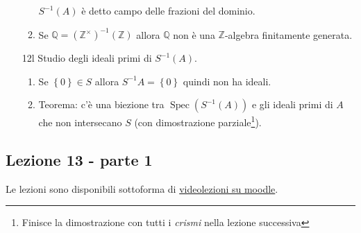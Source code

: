 \documentclass[italian]{article}
\begin{document}
\begin{enumerate}
\begin{enumerate}
            $S^{-1}(A)$ è detto campo delle frazioni del dominio.
          \item Se $\mathbb{Q} = (\mathbb{Z}^\times)^{-1}(\mathbb{Z})$ allora
            $\mathbb{Q}$ non è una $\mathbb{Z}$-algebra finitamente generata. 
        \end{enumerate}
      \item[12l] Studio degli ideali primi di $S^{-1}(A)$.
        \begin{enumerate}
          \item Se $\left\{ 0 \right\} \in S$ allora $S^{-1}A = \left\{ 0
            \right\}$ quindi non ha ideali.
          \item Teorema: c'è una biezione tra $\operatorname{Spec}(S^{-1}(A))$
            e gli ideali primi di $A$ che non intersecano $S$ (con
            dimostrazione parziale\footnote{Finisce la dimostrazione con tutti i 
            \textit{crismi} nella lezione successiva}).
        \end{enumerate}
	\end{enumerate}  

	\subsection{Lezione 13 - parte 1}
	
	Le lezioni sono disponibili sottoforma di 
	\href{https://didatticaonline.unitn.it/dol/course/view.php?id=23268}{videolezioni
		su moodle}.
	
\end{document}
